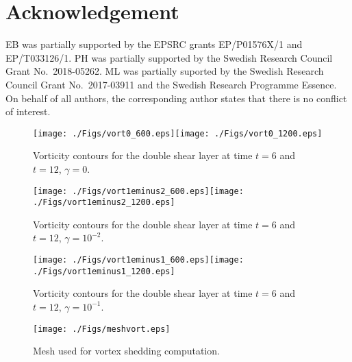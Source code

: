 \documentclass[10pt]{amsart}
\numberwithin{equation}{section}
\theoremstyle{definition}
\theoremstyle{remark}
\renewcommand{\(}{\bigl(}
\renewcommand{\)}{\bigr)}
\begin{document}
\section*{Acknowledgement}
EB was partially supported by the EPSRC grants  EP/P01576X/1 and EP/T033126/1. PH was partially supported by the Swedish Research
Council Grant No.\  2018-05262. ML was partially suported by the Swedish Research
Council Grant No.\  2017-03911 and the Swedish Research Programme
Essence.
On behalf of all authors, the corresponding author states that there is no conflict of interest. 


\newpage
\begin{figure}[ht]
	\begin{center}
		\texttt{[image: ./Figs/vort0\_600.eps]}\texttt{[image: ./Figs/vort0\_1200.eps]}
	\end{center}
	\caption{Vorticity contours for the double shear layer at time $t=6$ and $t=12$, $\gamma=0$.}
	\label{fig:vortnostab}
\end{figure}
\begin{figure}[ht]
	\begin{center}
		\texttt{[image: ./Figs/vort1eminus2\_600.eps]}\texttt{[image: ./Figs/vort1eminus2\_1200.eps]}
	\end{center}
	\caption{Vorticity contours for the double shear layer at time $t=6$ and $t=12$, $\gamma=10^{-2}$.}
	\label{fig:vortminus1}
\end{figure}

\begin{figure}[ht]
	\begin{center}
		\texttt{[image: ./Figs/vort1eminus1\_600.eps]}\texttt{[image: ./Figs/vort1eminus1\_1200.eps]}
	\end{center}
	\caption{Vorticity contours for the double shear layer at time $t=6$ and $t=12$, $\gamma=10^{-1}$.}
	\label{fig:vortminus2}
\end{figure}


\begin{figure}[ht]
	\begin{center}
		\texttt{[image: ./Figs/meshvort.eps]}
	\end{center}
	\caption{Mesh used for vortex shedding computation.}
	\label{fig:meshvort}
\end{figure}
\end{document}
